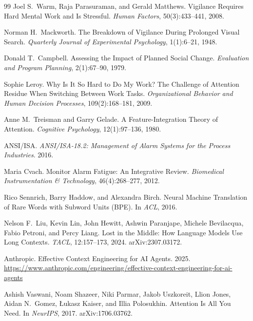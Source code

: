 \documentclass[11pt,a4paper]{article}
\theoremstyle{definition}
\theoremstyle{plain}
\begin{document}
\begin{thebibliography}{99}
Joel S.\ Warm, Raja Parasuraman, and Gerald Matthews.
\newblock Vigilance Requires Hard Mental Work and Is Stressful.
\newblock \textit{Human Factors}, 50(3):433--441, 2008.

Norman H.\ Mackworth.
\newblock The Breakdown of Vigilance During Prolonged Visual Search.
\newblock \textit{Quarterly Journal of Experimental Psychology}, 1(1):6--21, 1948.

Donald T.\ Campbell.
\newblock Assessing the Impact of Planned Social Change.
\newblock \textit{Evaluation and Program Planning}, 2(1):67--90, 1979.

Sophie Leroy.
\newblock Why Is It So Hard to Do My Work? The Challenge of Attention Residue When Switching Between Work Tasks.
\newblock \textit{Organizational Behavior and Human Decision Processes}, 109(2):168--181, 2009.

Anne M.\ Treisman and Garry Gelade.
\newblock A Feature-Integration Theory of Attention.
\newblock \textit{Cognitive Psychology}, 12(1):97--136, 1980.

ANSI/ISA.
\newblock \textit{ANSI/ISA-18.2: Management of Alarm Systems for the Process Industries}. 2016.

Maria Cvach.
\newblock Monitor Alarm Fatigue: An Integrative Review.
\newblock \textit{Biomedical Instrumentation \& Technology}, 46(4):268--277, 2012.

Rico Sennrich, Barry Haddow, and Alexandra Birch.
\newblock Neural Machine Translation of Rare Words with Subword Units (BPE).
\newblock In \textit{ACL}, 2016.

Nelson F.\ Liu, Kevin Lin, John Hewitt, Ashwin Paranjape, Michele Bevilacqua, Fabio Petroni, and Percy Liang.
\newblock Lost in the Middle: How Language Models Use Long Contexts.
\newblock \textit{TACL}, 12:157--173, 2024. arXiv:2307.03172.

Anthropic.
\newblock Effective Context Engineering for AI Agents. 2025.
\newblock \url{https://www.anthropic.com/engineering/effective-context-engineering-for-ai-agents}

Ashish Vaswani, Noam Shazeer, Niki Parmar, Jakob Uszkoreit, Llion Jones, Aidan N.\ Gomez, \L{}ukasz Kaiser, and Illia Polosukhin.
\newblock Attention Is All You Need.
\newblock In \textit{NeurIPS}, 2017. arXiv:1706.03762.


\end{thebibliography}
\end{document}
